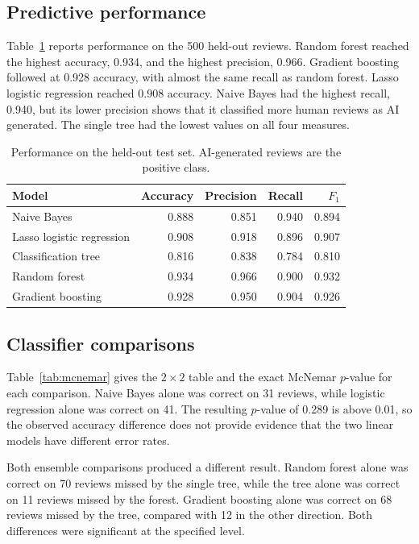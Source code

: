 \documentclass[onecolumn]{jmlr}
\begin{document}
\subsection{Predictive performance}

Table~\ref{tab:test-results} reports performance on the 500 held-out reviews. Random forest reached the highest accuracy, 0.934, and the highest precision, 0.966. Gradient boosting followed at 0.928 accuracy, with almost the same recall as random forest. Lasso logistic regression reached 0.908 accuracy. Naive Bayes had the highest recall, 0.940, but its lower precision shows that it classified more human reviews as AI generated. The single tree had the lowest values on all four measures.

\begin{table}[ht]
\centering
\caption{Performance on the held-out test set. AI-generated reviews are the positive class.}
\label{tab:test-results}
\begin{tabular}{lrrrr}
\toprule
Model & Accuracy & Precision & Recall & $F_1$ \\
\midrule
Naive Bayes & 0.888 & 0.851 & 0.940 & 0.894 \\
Lasso logistic regression & 0.908 & 0.918 & 0.896 & 0.907 \\
Classification tree & 0.816 & 0.838 & 0.784 & 0.810 \\
Random forest & 0.934 & 0.966 & 0.900 & 0.932 \\
Gradient boosting & 0.928 & 0.950 & 0.904 & 0.926 \\
\bottomrule
\end{tabular}
\end{table}

\subsection{Classifier comparisons}

Table~\ref{tab:mcnemar} gives the $2\times2$ table and the exact McNemar $p$-value for each comparison. Naive Bayes alone was correct on 31 reviews, while logistic regression alone was correct on 41. The resulting $p$-value of 0.289 is above 0.01, so the observed accuracy difference does not provide evidence that the two linear models have different error rates.

Both ensemble comparisons produced a different result. Random forest alone was correct on 70 reviews missed by the single tree, while the tree alone was correct on 11 reviews missed by the forest. Gradient boosting alone was correct on 68 reviews missed by the tree, compared with 12 in the other direction. Both differences were significant at the specified level.
\end{document}
